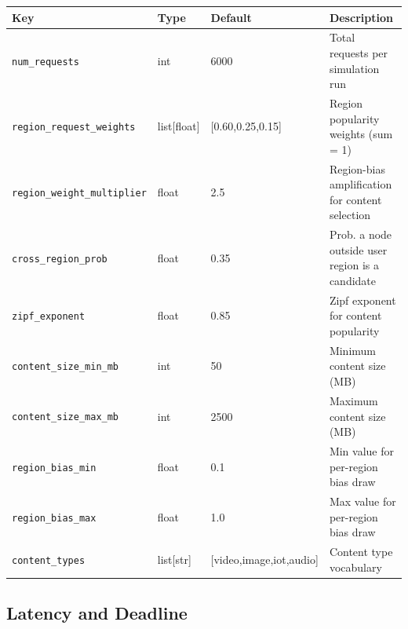 \documentclass[12pt]{article}
\begin{document}
\begin{tabularx}{\linewidth}{@{}l l l X@{}}
\toprule
\textbf{Key} & \textbf{Type} & \textbf{Default} & \textbf{Description} \\
\midrule
\texttt{num\_requests} & int & 6000 & Total requests per simulation run \\
\texttt{region\_request\_weights} & list[float] & [0.60,0.25,0.15] & Region popularity weights (sum = 1) \\
\texttt{region\_weight\_multiplier} & float & 2.5 & Region-bias amplification for content selection \\
\texttt{cross\_region\_prob} & float & 0.35 & Prob. a node outside user region is a candidate \\
\texttt{zipf\_exponent} & float & 0.85 & Zipf exponent for content popularity \\
\texttt{content\_size\_min\_mb} & int & 50 & Minimum content size (MB) \\
\texttt{content\_size\_max\_mb} & int & 2500 & Maximum content size (MB) \\
\texttt{region\_bias\_min} & float & 0.1 & Min value for per-region bias draw \\
\texttt{region\_bias\_max} & float & 1.0 & Max value for per-region bias draw \\
\texttt{content\_types} & list[str] & [video,image,iot,audio] & Content type vocabulary \\
\bottomrule
\end{tabularx}

\subsection{Latency and Deadline}
\end{document}
